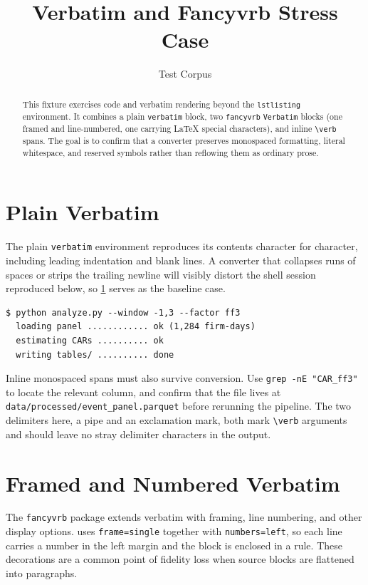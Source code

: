 \documentclass[11pt]{article}
\title{Verbatim and Fancyvrb Stress Case}
\author{Test Corpus}
\date{}
\begin{document}
\maketitle

\begin{abstract}
This fixture exercises code and verbatim rendering beyond the \texttt{lstlisting}
environment. It combines a plain \texttt{verbatim} block, two \texttt{fancyvrb}
\texttt{Verbatim} blocks (one framed and line-numbered, one carrying LaTeX
special characters), and inline \verb|\verb| spans. The goal is to confirm that a
converter preserves monospaced formatting, literal whitespace, and reserved
symbols rather than reflowing them as ordinary prose.
\end{abstract}

\section{Plain Verbatim}
\label{sec:plain}

The plain \texttt{verbatim} environment reproduces its contents character for
character, including leading indentation and blank lines. A converter that
collapses runs of spaces or strips the trailing newline will visibly distort the
shell session reproduced below, so \cref{sec:plain} serves as the baseline case.

\begin{verbatim}
$ python analyze.py --window -1,3 --factor ff3
  loading panel ............ ok (1,284 firm-days)
  estimating CARs .......... ok
  writing tables/ .......... done
\end{verbatim}

Inline monospaced spans must also survive conversion. Use \verb|grep -nE "CAR_ff3"|
to locate the relevant column, and confirm that the file lives at
\verb!data/processed/event_panel.parquet! before rerunning the pipeline. The two
delimiters here, a pipe and an exclamation mark, both mark \verb|\verb| arguments
and should leave no stray delimiter characters in the output.

\section{Framed and Numbered Verbatim}
\label{sec:framed}

The \texttt{fancyvrb} package extends verbatim with framing, line numbering, and
other display options.  uses \verb|frame=single| together with
\verb|numbers=left|, so each line carries a number in the left margin and the
block is enclosed in a rule. These decorations are a common point of fidelity
loss when source blocks are flattened into paragraphs.
\end{document}
